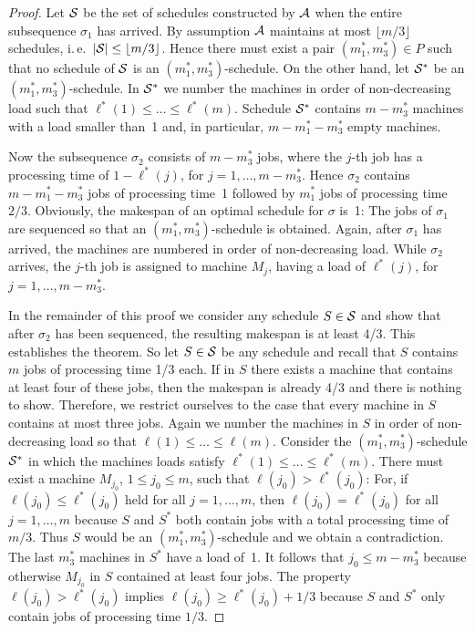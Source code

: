\documentclass{llncs}
\begin{document}
\begin{proof}
Let ${\cal S}$ be the set of schedules constructed by ${\cal A}$ when the entire subsequence 
$\sigma_1$ has arrived. By assumption ${\cal A}$ maintains at most $\lfloor m/3\rfloor$ schedules, 
i.\,e.\ $|{\cal S}| \leq \lfloor m/3\rfloor$. Hence there must exist a pair $(m_1^*,m_3^*)\in P$
such that no schedule of ${\cal S}$ is an $(m_1^*,m_3^*)$-schedule. On the other hand, let ${\cal S}^*$ 
be an $(m_1^*,m_3^*)$-schedule. In ${\cal S}^*$ we number the machines in order of non-decreasing load
such that $\ell^*(1) \leq \ldots \leq \ell^*(m)$. Schedule ${\cal S}^*$ contains $m - m_3^*$ machines
with a load smaller than~1 and, in particular, $m-m_1^*-m_3^*$ empty machines. 

Now the subsequence $\sigma_2$ consists of $m-m_3^*$ jobs, where the $j$-th job has a processing time of
$1-\ell^*(j)$, for $j=1,\ldots, m-m_3^*$. Hence $\sigma_2$ contains $m-m_1^*-m_3^*$ jobs of
processing time~1 followed by $m_1^*$ jobs of processing time~$2/3$. Obviously, the makespan of an 
optimal schedule for $\sigma$ is~1: The jobs of $\sigma_1$ are sequenced so that an $(m_1^*,m_3^*)$-schedule 
is obtained. Again, after $\sigma_1$ has arrived, the machines are numbered in order of non-decreasing
load. While $\sigma_2$ arrives, the $j$-th job is assigned to machine $M_j$, having a load of $\ell^*(j)$,
for $j=1,\ldots, m-m_3^*$. 

In the remainder of this proof we consider any schedule $S\in {\cal S}$ and show that after $\sigma_2$ 
has been sequenced, the resulting makespan is at least 4/3. This establishes the theorem.
So let $S \in {\cal S}$ be any schedule and recall that $S$ contains $m$ jobs of processing time 1/3
each. If in $S$ there exists a machine that contains at least four of these jobs, then the makespan
is already 4/3 and there is nothing to show. Therefore, we restrict ourselves to the case that
every machine in $S$ contains at most three jobs. Again we number the machines in $S$ in order of
non-decreasing load so that $\ell(1) \leq \ldots \leq \ell(m)$. Consider the $(m_1^*,m_3^*)$-schedule
${\cal S}^*$ in which the machines loads satisfy $\ell^*(1) \leq \ldots \leq \ell^*(m)$. There must
exist a machine $M_{j_0}$, $1\leq j_0 \leq m$, such that $\ell(j_0) > \ell^*(j_0)$: For, if  
$\ell(j_0) \leq \ell^*(j_0)$ held for all $j= 1,\ldots, m$, then $\ell(j_0) = \ell^*(j_0)$ for all 
$j= 1,\ldots, m$ because $S$ and $S^*$ both contain jobs with a total processing time of $m/3$. Thus $S$ would
be an $(m_1^*,m_3^*)$-schedule and we obtain a contradiction. The last $m_3^*$ machines in $S^*$ 
have a load of~1. It follows that $j_0 \leq m-m_3^*$ because otherwise $M_{j_0}$ in $S$ contained
at least four jobs. The property $\ell(j_0) > \ell^*(j_0)$ implies $\ell(j_0) \geq \ell^*(j_0) +1/3$
because $S$ and $S^*$ only contain jobs of processing time $1/3$.


\end{proof}
\end{document}
